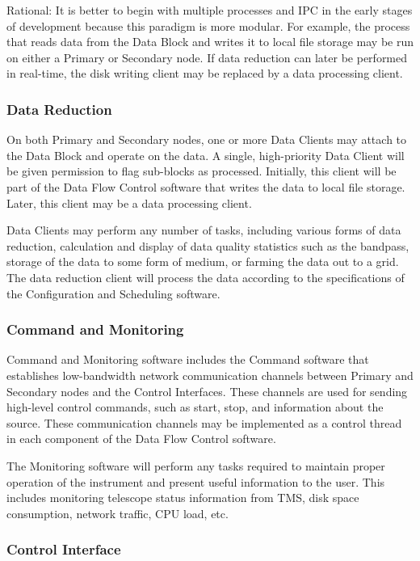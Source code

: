 Rational: It is better to begin with multiple processes and IPC in the
early stages of development because this paradigm is more modular.
For example, the process that reads data from the Data Block and
writes it to local file storage may be run on either a Primary or
Secondary node.  If data reduction can later be performed in
real-time, the disk writing client may be replaced by a data
processing client.

\subsubsection{Data Reduction}

On both Primary and Secondary nodes, one or more Data Clients may
attach to the Data Block and operate on the data.  A single,
high-priority Data Client will be given permission to flag sub-blocks
as processed.  Initially, this client will be part of the Data Flow
Control software that writes the data to local file storage.  Later,
this client may be a data processing client.  

Data Clients may perform any number of tasks, including various forms
of data reduction, calculation and display of data quality statistics
such as the bandpass, storage of the data to some form of medium, or
farming the data out to a grid.  The data reduction client will
process the data according to the specifications of the Configuration
and Scheduling software.

\subsubsection{Command and Monitoring}

Command and Monitoring software includes the Command software that
establishes low-bandwidth network communication channels between
Primary and Secondary nodes and the Control Interfaces.  These
channels are used for sending high-level control commands, such as
start, stop, and information about the source.  These communication
channels may be implemented as a control thread in each component of
the Data Flow Control software. 

The Monitoring software will perform any tasks required to maintain
proper operation of the instrument and present useful information to
the user.  This includes monitoring telescope status information from
TMS, disk space consumption, network traffic, CPU load, etc.

\subsubsection{Control Interface}

